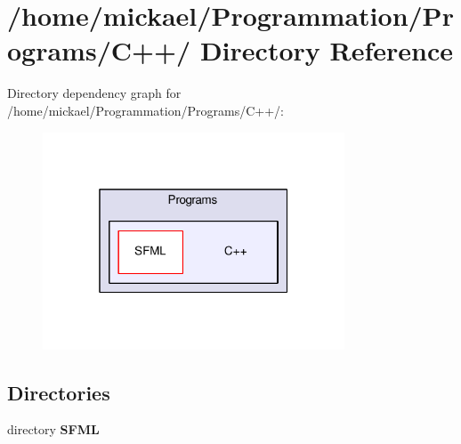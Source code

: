 \section{/home/mickael/\-Programmation/\-Programs/\-C++/ Directory Reference}
\label{dir_cb30496813d84da11f485a183f3404fe}
Directory dependency graph for /home/mickael/\-Programmation/\-Programs/\-C++/\-:\nopagebreak
\begin{figure}[H]
\begin{center}
\leavevmode
\includegraphics[width=254pt]{dir_cb30496813d84da11f485a183f3404fe_dep}
\end{center}
\end{figure}
\subsection*{Directories}
\begin{DoxyCompactItemize}
\item 
directory {\bf S\-F\-M\-L}
\end{DoxyCompactItemize}
